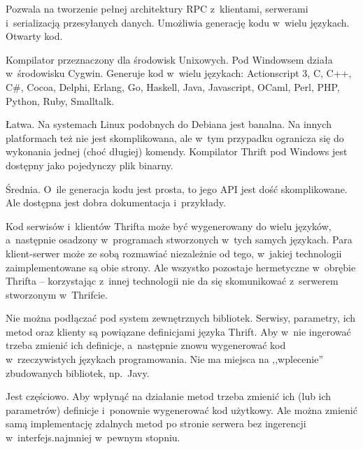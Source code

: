 \begin{description}
Pozwala na tworzenie pełnej architektury RPC z~klientami, serwerami i~serializacją przesyłanych danych. Umożliwia generację kodu w~wielu językach. Otwarty kod. 

Kompilator przeznaczony dla środowisk Unixowych. Pod Windowsem działa w~środowisku Cygwin.
Generuje kod w~wielu językach: Actionscript 3, C, C++, C\#, Cocoa, Delphi, Erlang, Go, Haskell, Java, Javascript, OCaml, Perl, PHP, Python, Ruby, Smalltalk\cite{thrift-features}.

Łatwa.
Na systemach Linux podobnych do Debiana jest banalna. Na innych platformach też nie jest skomplikowana, ale w~tym przypadku ogranicza się do wykonania jednej (choć długiej) komendy.
Kompilator Thrift pod Windows jest dostępny jako pojedynczy plik binarny.

Średnia. O~ile generacja kodu jest prosta, to jego API jest dość skomplikowane. Ale dostępna jest dobra dokumentacja i~przykłady.

Kod serwisów i~klientów Thrifta może być wygenerowany do wielu języków, a~następnie osadzony w~programach stworzonych w~tych samych językach.
Para klient-serwer może ze sobą rozmawiać niezależnie od tego, w~jakiej technologii zaimplementowane są obie strony.
Ale wszystko pozostaje hermetyczne w~obrębie Thrifta -- korzystając z~innej technologii nie da się skomunikować z~serwerem stworzonym w~Thrifcie.

Nie można podłączać pod system zewnętrznych bibliotek. Serwisy, parametry, ich metod oraz klienty są powiązane definicjami języka Thrift.
Aby w~nie ingerować trzeba zmienić ich definicje, a~następnie znowu wygenerować kod w~rzeczywistych językach programowania. Nie ma miejsca na ,,wplecenie'' zbudowanych bibliotek, np.\ Javy.


Jest częściowo. Aby wpłynąć na działanie metod trzeba zmienić ich (lub ich parametrów) definicje i~ponownie wygenerować kod użytkowy.
Ale można zmienić samą implementację zdalnych metod po stronie serwera bez ingerencji w~interfejs.najmniej w~pewnym stopniu. 


\end{description}
